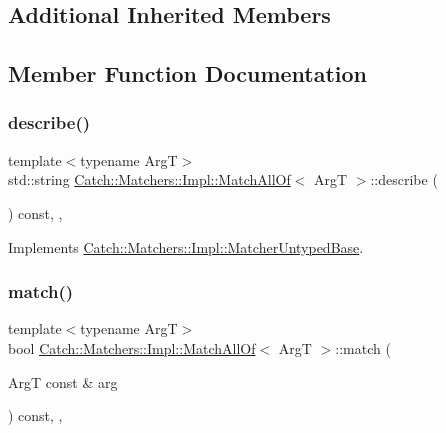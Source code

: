 \subsection*{Additional Inherited Members}


\subsection{Member Function Documentation}
\mbox{\label{struct_catch_1_1_matchers_1_1_impl_1_1_match_all_of_acbb9a083e93b546fd33c9235b644c40f}} 
\subsubsection{\texorpdfstring{describe()}{describe()}}
{\footnotesize\ttfamily template$<$typename ArgT$>$ \\
std\+::string \mbox{\hyperlink{struct_catch_1_1_matchers_1_1_impl_1_1_match_all_of}{Catch\+::\+Matchers\+::\+Impl\+::\+Match\+All\+Of}}$<$ ArgT $>$\+::describe (\begin{DoxyParamCaption}{ }\end{DoxyParamCaption}) const\hspace{0.3cm}{\ttfamily [inline]}, {\ttfamily [override]}, {\ttfamily [virtual]}}



Implements \mbox{\hyperlink{class_catch_1_1_matchers_1_1_impl_1_1_matcher_untyped_base_a91d3a907dbfcbb596077df24f6e11fe2}{Catch\+::\+Matchers\+::\+Impl\+::\+Matcher\+Untyped\+Base}}.

\mbox{\label{struct_catch_1_1_matchers_1_1_impl_1_1_match_all_of_acfb377bda2c58ae62e6df9c3a8a89f8f}} 
\subsubsection{\texorpdfstring{match()}{match()}}
{\footnotesize\ttfamily template$<$typename ArgT$>$ \\
bool \mbox{\hyperlink{struct_catch_1_1_matchers_1_1_impl_1_1_match_all_of}{Catch\+::\+Matchers\+::\+Impl\+::\+Match\+All\+Of}}$<$ ArgT $>$\+::match (\begin{DoxyParamCaption}\item[{ArgT const \&}]{arg }\end{DoxyParamCaption}) const\hspace{0.3cm}{\ttfamily [inline]}, {\ttfamily [override]}, {\ttfamily [virtual]}}



